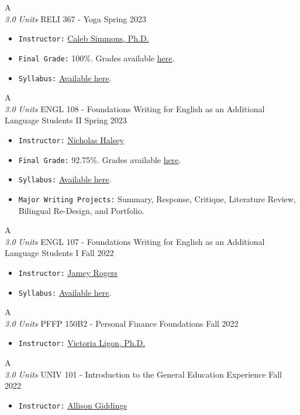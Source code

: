 \cventry
{A \\ \small{\textit{3.0 Units}}}
{RELI 367 - Yoga}
{Spring 2023}
{}
{}
{
  \begin{itemize}
    \item \texttt{Instructor:} \href{https://religion.arizona.edu/people/calebsimmons}{Caleb Simmons, Ph.D.}
    \item \texttt{Final Grade:} 100\%. Grades available \href{https://mhrezaei.com/assets/cv/courses/Spring2023/RELI367/Grades.pdf}{here}.
    \item \texttt{Syllabus:} \href{https://mhrezaei.com/assets/cv/courses/Spring2023/RELI367/Syllabus.pdf}{Available here}.
  \end{itemize}
}

\cventry
{A \\ \small{\textit{3.0 Units}}}
{ENGL 108 - Foundations Writing for English as an Additional Language Students II}
{Spring 2023}
{}
{}
{
  \begin{itemize}
    \item \texttt{Instructor:} \href{https://english.arizona.edu/people/nicholas-barlow-halsey}{Nicholas Halsey}
    \item \texttt{Final Grade:} 92.75\%. Grades available \href{https://mhrezaei.com/assets/cv/courses/Spring2023/ENGL108/Grades.pdf}{here}.
    \item \texttt{Syllabus:} \href{https://mhrezaei.com/assets/cv/courses/Spring2023/ENGL108/Syllabus.pdf}{Available here}.
    \item \texttt{Major Writing Projects:} Summary, Response, Critique, Literature Review, Bilingual Re-Design, and Portfolio.
  \end{itemize}
}

\cventry
{A \\ \small{\textit{3.0 Units}}}
{ENGL 107 - Foundations Writing for English as an Additional Language Students I}
{Fall 2022}
{}
{}
{
  \begin{itemize}
    \item \texttt{Instructor:} \href{https://english.arizona.edu/people/jamey-rogers}{Jamey Rogers}
    \item \texttt{Syllabus:} \href{https://mhrezaei.com/assets/cv/courses/Fall2022/ENGL107/Syllabus.pdf}{Available here}.
  \end{itemize}
}

\cventry
{A \\ \small{\textit{3.0 Units}}}
{PFFP 150B2 - Personal Finance Foundations}
{Fall 2022}
{}
{}
{
  \begin{itemize}
    \item \texttt{Instructor:} \href{https://norton.arizona.edu/person/victoria-ligon-phd}{Victoria Ligon, Ph.D.}
  \end{itemize}
}

\cventry
{A \\ \small{\textit{3.0 Units}}}
{UNIV 101 - Introduction to the General Education Experience}
{Fall 2022}
{}
{}
{
  \begin{itemize}
    \item \texttt{Instructor:} \href{https://rec.arizona.edu/staff/allison-giddings}{Allison Giddings}
  \end{itemize}
}